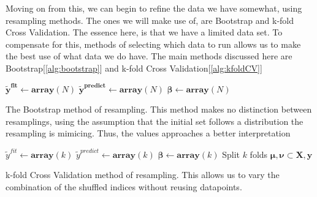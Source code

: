 \documentclass[15pt comic sans]{revtex4-2}
\begin{document}
Moving on from this, we can begin to refine the data we have somewhat, using resampling 
methods. The ones we will make use of, are Bootstrap and k-fold Cross Validation. 
The essence here, is that we have a limited data set. To compensate for this, methods of
selecting which data to run allows us to make the best use of what data we do have. 
The main methods discussed here are Bootstrap[\ref{alg:bootstrap}] and k-fold Cross 
Validation[\ref{alg:kfoldCV}]

\begin{algorithm}
	\DontPrintSemicolon
	$\bm{\tilde{y}^{fit}} \gets \mathbf{array}(N)$\;
	$\bm{\tilde{y}^{predict}} \gets \mathbf{array}(N)$\;
	$\bm{\beta} \gets \mathbf{array}(N)$\;
	\caption{The Bootstrap method of resampling. This method makes no distinction
	between resamplings, using the assumption that the initial set follows a 
	distribution the resampling is mimicing. Thus, the values approaches a better 
	interpretation}
	\label{alg:bootstrap}
\end{algorithm}

\begin{algorithm}
	\DontPrintSemicolon
	$\tilde{y}^{fit} \gets \mathbf{array}(k)$\;
	$\tilde{y}^{predict} \gets \mathbf{array}(k)$\;
	$\bm{\beta} \gets \mathbf{array}(k)$\;
	Split $k$ folds $\bm{\mu}, \bm{\nu} \subset \bm{X}, \bm{y}$\;
	\caption{k-fold Cross Validation method of resampling. This allows us to vary the 
	combination of the shuffled indices without reusing datapoints.}
	\label{alg:kfoldCV}
\end{algorithm}
\end{document}
